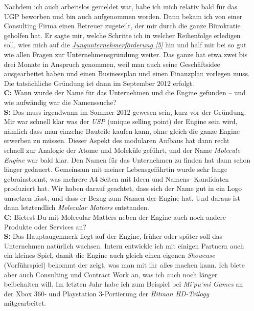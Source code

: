 \documentclass[10pt,a4paper,ngerman,twoside]{article} %
\begin{document}
\begin{multicols}{3}
Nachdem ich auch arbeitslos gemeldet war, habe ich mich relativ bald für das UGP beworben und bin auch aufgenommen worden. Dann bekam ich von einer Consulting Firma einen Betreuer zugeteilt, der mir durch die ganze Bürokratie geholfen hat. Er sagte mir, welche Schritte ich in welcher Reihenfolge erledigen soll, wies mich auf die \href{https://www.gruenderservice.at/Content.Node/gruenden/Jungunternehmerfoerderungen.html}{\textit{Jungunternehmerförderung [5]}} hin und half mir bei so gut wie allen Fragen zur Unternehmensgründung weiter. Das ganze hat etwa zwei bis drei Monate in Anspruch genommen, weil man auch seine Geschäftsidee ausgearbeitet haben und einen Businessplan und einen Finanzplan vorlegen muss. Die tatsächliche Gründung ist dann im September 2012 erfolgt. \\
\textbf{C:} Wann wurde der Name für das Unternehmen und die Engine gefunden – und wie aufwändig war die Namenssuche? \\
\textbf{S:} Das muss irgendwann im Sommer 2012 gewesen sein, kurz vor der Gründung. Mir war schnell klar was der \textit{USP} (unique selling point) der Engine sein wird, nämlich dass man einzelne Bauteile kaufen kann, ohne gleich die ganze Engine erwerben zu müssen. Dieser Aspekt des modularen Aufbaus hat dann recht schnell zur Analogie der Atome und Moleküle geführt, und der Name \textit{Molecule Engine} war bald klar. Den Namen für das Unternehmen zu finden hat dann schon länger gedauert. Gemeinsam mit meiner Lebensgefährtin wurde sehr lange gebrainstormt, was mehrere A4 Seiten mit Ideen und Namens- Kandidaten produziert hat. Wir haben darauf geachtet, dass sich der Name gut in ein Logo umsetzen lässt, und dass er Bezug zum Namen der Engine hat. Und daraus ist dann letztendlich \textit{Molecular Matters} entstanden. \\
\textbf{C:} Bietest Du mit Molecular Matters neben der Engine auch noch andere Produkte oder Services an? \\
\textbf{S:} Das Hauptaugenmerk liegt auf der Engine, früher oder später soll das Unternehmen natürlich wachsen. Intern entwickle ich mit einigen Partnern auch ein kleines Spiel, damit die Engine auch gleich einen eigenen \textit{Showcase} (Vorführspiel) bekommt der zeigt, was man mit ihr alles machen kann. Ich biete aber auch Consulting und Contract Work an, was ich auch noch länger beibehalten will. Im letzten Jahr habe ich zum Beispiel bei \textit{Mi’pu’mi Games} an der Xbox 360- und Playstation 3-Portierung der \textit{Hitman HD-Trilogy} mitgearbeitet.


\end{multicols}
\end{document}
